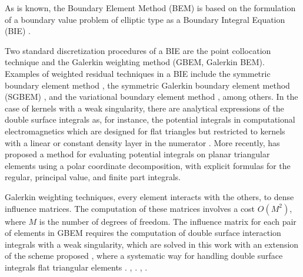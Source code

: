 \documentclass[oneside,onecolumn,10pt,final]{asme2ej}
\newcounter{tema}
\begin{document}
\noindent
As is  known, the Boundary Element Method (BEM) is based 
on the formulation of a boundary value problem of elliptic 
type as a Boundary Integral Equation (BIE) %
\cite{rf:power-wrobel,rf:jdelia-asmejfe}.
%

\noindent
Two standard discretization procedures of a BIE are the 
point collocation technique\hg{,} and the Galerkin
weighting method (GBEM, Galerkin BEM).
%
Examples of weighted residual techniques in a BIE include 
%
the symmetric boundary element method %
\cite{rf:terravecchia3}, %
the symmetric Galerkin boundary element method (SGBEM)%
\cite{rf:zhaoyuan,rf:sgbem-book1,rf:salvadori1}, %
and the variational boundary element method %
\cite{rf:alia-souli-erchiqui}, among others.
%
In the case of kernels with a weak singularity, there are 
analytical expressions of the double surface integrals as, 
for instance, the potential integrals in computational 
electromagnetics\hg{,} which are designed for flat triangles
but restricted to kernels with a linear or constant
density layer in the numerator \cite{rf:sievers}.
%
More recently,  %
\cite{rf:carley-2013} has proposed a method for evaluating
potential integrals on planar triangular elements using a
polar coordinate decomposition, with explicit formulas for
the regular, principal value, and finite part integrals.

\noindent
{}
Galerkin weighting techniques, every element interacts 
with the others,  to dense influence matrices.
The computation of these matrices involves a cost $O(M^2)$,
where $M$ is the number of degrees of freedom.
%
The influence matrix for each pair of elements in GBEM
requires the computation of double surface interaction
integrals with a weak singularity, which are solved in this
work with an extension of the scheme proposed 
\cite{rf:taylordj1}, where a systematic way for handling 
double surface integrals  flat triangular elements
.
 \cite{rf:taylordj1}, 
. 
 \cite{rf:jdelia-gbem1,rf:ssarraf-torus},
.
\end{document}
